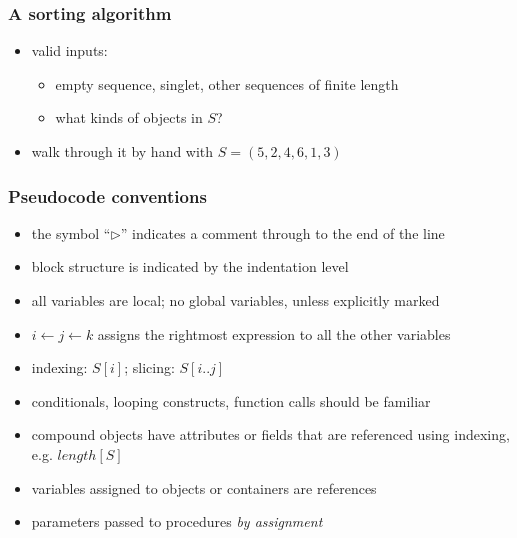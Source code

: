 \begin{frame}[fragile]
%
  \frametitle{A sorting algorithm}
%
    \begin{center}
      \begin{minipage}{.75\linewidth}
        \begin{algorithm}[H]
          \label{alg:insertion-sort}
%
          \DontPrintSemicolon
          \SetAlCapHSkip{0ex}
%
          \caption{\insertionsort($S$)}
          \vspace{.5em}
%
%
          \vspace{.5em}
%
        \end{algorithm}
      \end{minipage}
    \end{center}
%
  \begin{itemize}
%
  \item valid inputs:
    \begin{itemize}
    \item empty sequence, singlet, other sequences of finite length
    \item what kinds of objects in $S$?
    \end{itemize}
%
  \item walk through it by hand with $S = (5, 2, 4, 6, 1, 3)$
%
  \end{itemize}
%
\end{frame}

\begin{frame}[fragile]
%
  \frametitle{Pseudocode conventions}
%
  \begin{itemize}
  \item the symbol ``$\triangleright$'' indicates a comment through to the end of the line
  \item block structure is indicated by the indentation level
  \item all variables are local; no global variables, unless explicitly marked
  \item $i \leftarrow j \leftarrow k$ assigns the rightmost expression to all the other
    variables
  \item indexing: $S[i]$; slicing: $S[i .. j]$
  \item conditionals, looping constructs, function calls should be familiar
  \item compound objects have attributes or fields that are referenced using indexing,
    e.g. $length[S]$
  \item variables assigned to objects or containers are references
  \item parameters passed to procedures {\em by assignment}
  \end{itemize}
%
\end{frame}
        
